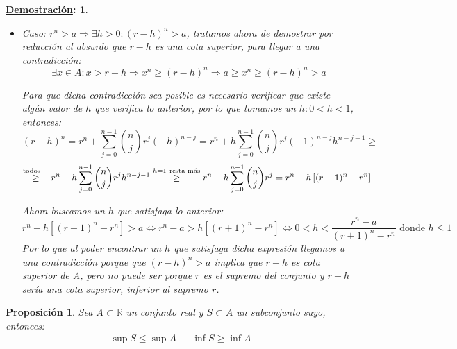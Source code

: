 \documentclass[10pt,a4paper,openright]{book}
\theoremstyle{break}
\newtheorem*{prop}{Proposición}
\newtheorem*{demo}{\underline{Demostración}:}
\begin{document}
\begin{demo}
\begin{enumerate}
\begin{itemize}
\footnote{$\sum_{j=0}^{n-1}\binom{n}{j}r^j=\left[(r+1)^n-r^n\right]$, despejando el sumatorio de la expresión: $(r+h)^n=r^n+\sum_{j=0}^{n-1}\binom{n}{j}r^jh^{n-j}$, cuando $h=1$}

Ahora buscamos un $h$ que satisfaga:
$$r^n+h\left[(r+1)^n-r^n\right] <a \Rightarrow h<\frac{a-r^n}{(r+1)^n-r^n}$$
Luego puedo elegir un $0<h<\frac{a-r^n}{(r+1)^n-r^n}$ y $h<1$, porque entre dos positivos hay infinitos números.\par
Como existe dicho valor de $h$, llegamos a una contradicción porque que $(r+h)^n<a$ implica que $r+h\in A$, pero no puede ser porque $r$ es el supremo del conjunto y $r+h>r>x\in A=r+h\Rightarrow$ \#.
\vspace{0.5cm}
	\item Caso: $r^n>a\Rightarrow \exists h>0: (r-h)^n>a$, tratamos ahora de demostrar por reducción al absurdo que $r-h$ es una cota superior, para llegar a una contradicción:
$$\exists x\in A: x>r-h\Rightarrow x^n\geq (r-h)^n\Rightarrow a\geq x^n\geq (r-h)^n>a$$

Para que dicha contradicción sea posible es necesario verificar que existe algún valor de $h$ que verifica lo anterior, por lo que tomamos un $h: 0<h<1$, entonces:
$$(r-h)^n=r^n+\sum_{j=0}^{n-1}\binom{n}{j}r^j(-h)^{n-j}=r^n+h\sum_{j=0}^{n-1}\binom{n}{j}r^j(-1)^{n-j}h^{n-j-1}\geq $$
$$\stackrel{\mbox{\scriptsize{todos }}-}{\geq} r^n-h\sum_{j=0}^{n-1}\binom{n}{j}r^j h^{n-j-1}\stackrel{h=1\mbox{ \scriptsize{resta más}}}{\geq} r^n-h\sum_{j=0}^{n-1}\binom{n}{j}r^j=r^n-h\left[(r+1)^n-r^n\right]$$

Ahora buscamos un $h$ que satisfaga lo anterior:
$$r^n-h\left[(r+1)^n-r^n\right]>a\Leftrightarrow r^n-a>h\left[(r+1)^n-r^n\right]\Leftrightarrow 0<h<\frac{r^n-a}{(r+1)^n-r^n}\mbox{ donde } h\leq 1$$
Por lo que al poder encontrar un $h$ que satisfaga dicha expresión llegamos a una contradicción porque que $(r-h)^n>a$ implica que $r-h$ es cota superior de A, pero no puede ser porque $r$ es el supremo del conjunto y $r-h$ sería una cota superior, inferior al supremo $r$.
\end{itemize}
\end{enumerate}
\end{demo}

\begin{prop}
Sea $A\subset \mathbb{R}$ un conjunto real y $S\subset A$ un subconjunto suyo, entonces:
\begin{align*}
\sup S\leq \sup A && \inf S\geq \inf A
\end{align*}
\end{prop}
\end{document}
